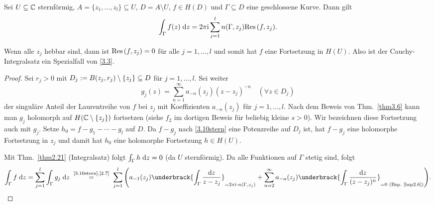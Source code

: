 \documentclass[a4paper,twoside,DIV15,BCOR12mm]{scrbook}
\begin{document}
\begin{thm}[Residuensatz] \label{thm3.10}
  Sei $U\subseteq\mathbb{C}$ sternförmig, $A=\{z_1,\dotsc,z_l\}\subseteq U$, $D=A\setminus U$, $f\in H(D)$ und $\Gamma\subseteq D$ eine
  geschlossene Kurve. Dann gilt
  \begin{equation} \label{3.3}
    \int_{\Gamma}^{}{f(z)}\;\mathrm{d} z = 2\pi\mathrm{i} \sum_{j=1}^l{n(\Gamma,z_j)\mathrm{Res}\left(f,z_j\right)}.
  \end{equation}
\end{thm}
\begin{bem*}
  Wenn alle $z_j$ hebbar sind, dann ist $\mathrm{Res}\left(f,z_j\right)=0$ für alle $j=1,\dotsc,l$ und somit hat $f$ eine Fortsetzung in
  $H(U)$. Also ist der Cauchy-Integralsatz ein Spezialfall von \eqref{3.3}.
\end{bem*}
\begin{proof}
  Sei $r_j>0$ mit $D_j:= B(z_j,r_j)\setminus\{z_j\} \subseteq D$ für $j=1,\dotsc,l$. Sei weiter
  \begin{equation*} \label{3.10stern}
    g_j(z) = \sum_{n=1}^\infty {a_{-n}(z_j)(z-z_j)^{-n}} \quad (\forall z\in D_j) \tag{$*$}
  \end{equation*}
  der singuläre Anteil der Laurentreihe von $f$ bei $z_j$ mit Koeffizienten $a_{-n}(z_j)$ für $j=1,\dotsc,l$. Nach dem Beweis
  von Thm.~\ref{thm3.6} kann man $g_j$ holomorph auf $H(\mathbb{C}\setminus\{z_j\})$ fortsetzen (siehe $f_2$ im dortigen Beweis für
  beliebig kleine $s>0$). Wir bezeichnen diese Fortsetzung auch mit $g_j$. Setze $h_0=f-g_1-\dotsb-g_l$ auf $D$. Da $f-g_j$ nach
  \eqref{3.10stern} eine Potenzreihe auf $D_j$ ist, hat $f-g_j$ eine holomorphe Fortsetzung in $z_j$ und damit hat $h_0$ eine
  holomorphe Fortsetzung $h\in H(U)$.

  Mit Thm.~\ref{thm2.21} (Integralsatz) folgt $\int_{\Gamma}^{}{h}\;\mathrm{d} z=0$ (da $U$ sternförmig). Da alle Funktionen auf
  $\Gamma$ stetig sind, folgt
  \[ \integral{\Gamma}{}{f}{z} = \sum_{j=1}^l{\integral{\Gamma}{}{g_j}{z}} \nach{=}{\eqref{3.10stern},\eqref{2.7}}
  \sum_{j=1}^l{\Biggl(a_{-1}(z_j) \underbrack{\int_\Gamma{\frac{\d z}{z-z_j}}}_{=2\pi\i\cdot n(\Gamma,z_j)} +
      \sum_{n=2}^\infty{a_{-n}(z_j) \underbrack{\int_\Gamma{\frac{\d z}{(z-z_j)^n}}}_{=0\text{ (Bsp.~\ref{bsp2.6})}}} \Biggr)}. \qedhere \]
\end{proof}


\end{document}
